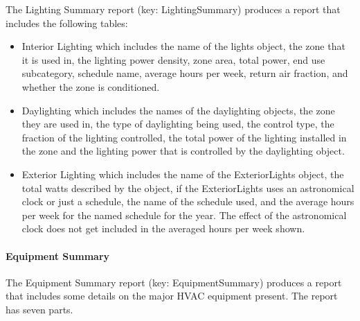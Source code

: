 The Lighting Summary report (key: LightingSummary) produces a report that includes the following tables:

\begin{itemize}
\item
  Interior Lighting which includes the name of the lights object, the zone that it is used in, the lighting power density, zone area, total power, end use subcategory, schedule name, average hours per week, return air fraction, and whether the zone is conditioned.
\item
  Daylighting which includes the names of the daylighting objects, the zone they are used in, the type of daylighting being used, the control type, the fraction of the lighting controlled, the total power of the lighting installed in the zone and the lighting power that is controlled by the daylighting object.
\item
  Exterior Lighting which includes the name of the ExteriorLights object, the total watts described by the object, if the ExteriorLights uses an astronomical clock or just a schedule, the name of the schedule used, and the average hours per week for the named schedule for the year. The effect of the astronomical clock does not get included in the averaged hours per week shown.
\end{itemize}

\paragraph{Equipment Summary}\label{equipment-summary}

The Equipment Summary report (key: EquipmentSummary) produces a report that includes some details on the major HVAC equipment present. The report has seven parts.

